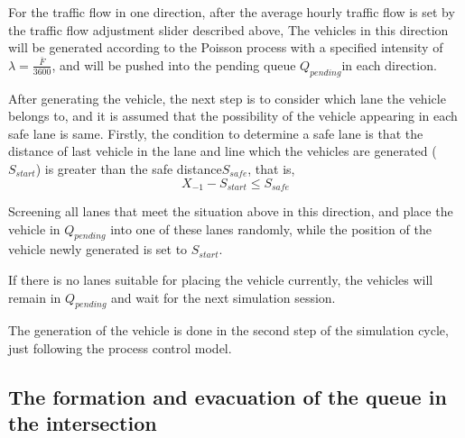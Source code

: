 \documentclass[a4paper]{paper}
\begin{document}
For the traffic flow in one direction, after the average hourly traffic flow is set by the traffic flow adjustment slider described above, The vehicles in this direction will be generated according to the Poisson process with a specified intensity of $\lambda=\displaystyle{\frac{\bar{F}}{3600}}$, and will be pushed into the pending queue $Q_{pending}$in each direction.

After generating the vehicle, the next step is to consider which lane the vehicle belongs to, and it is assumed that the possibility of the vehicle appearing in each safe lane is same. Firstly, the condition to determine a safe lane is that the distance of last vehicle in the lane and line which the vehicles are generated ($S_{start}$) is greater than the safe distance$S_{safe}$, that is,
$$X_{-1}-S_{start}\le S_{safe}$$

Screening all lanes that meet the situation above in this direction, and place the vehicle in $Q_{pending}$ into one of these lanes randomly, while the position of the vehicle newly generated is set to $S_{start}$.

If there is no lanes suitable for placing the vehicle currently, the vehicles will remain in $Q_{pending}$ and wait for the next simulation session.

The generation of the vehicle is done in the second step of the simulation cycle, just following the process control model.
\subsection{The formation and evacuation of the queue in the intersection}
\end{document}
